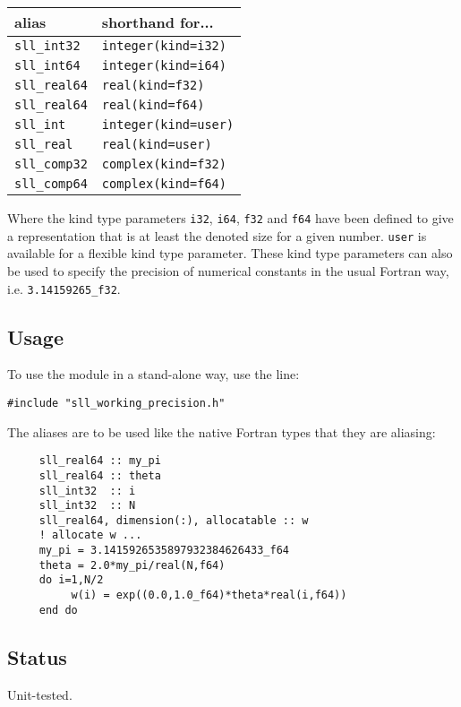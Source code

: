 \documentclass[]{report}   %
\begin{document}
\vspace{+0.5cm}
\begin{tabular}{l l}
alias & shorthand for... \\
\hline
\verb+sll_int32+ & \verb+integer(kind=i32)+ \\
\verb+sll_int64+ & \verb+integer(kind=i64)+ \\
\verb+sll_real64+ & \verb+real(kind=f32)+ \\
\verb+sll_real64+ & \verb+real(kind=f64)+ \\
\verb+sll_int+  & \verb+integer(kind=user)+ \\
\verb+sll_real+ & \verb+real(kind=user)+ \\
\verb+sll_comp32+ & \verb+complex(kind=f32)+\\
\verb+sll_comp64+ & \verb+complex(kind=f64)+\\
\hline
\end{tabular}
\vspace{+0.5cm}


Where the kind type parameters \verb+i32+, \verb+i64+, \verb+f32+ and \verb+f64+ have been defined to give a representation that is at least the denoted size for a given number. \verb+user+ is available for a flexible kind type parameter. These kind type parameters can also be used to specify the precision of numerical constants in the usual Fortran way, i.e. \verb+3.14159265_f32+.

\subsection{Usage}
To use the module in a stand-alone way, use the line:
\begin{verbatim}
#include "sll_working_precision.h"
\end{verbatim}

The aliases are to be used like the native Fortran types that they are aliasing:

\begin{verbatim}
     sll_real64 :: my_pi
     sll_real64 :: theta
     sll_int32  :: i
     sll_int32  :: N
     sll_real64, dimension(:), allocatable :: w
     ! allocate w ...
     my_pi = 3.1415926535897932384626433_f64
     theta = 2.0*my_pi/real(N,f64)
     do i=1,N/2
          w(i) = exp((0.0,1.0_f64)*theta*real(i,f64))
     end do
\end{verbatim}

\subsection{Status}
Unit-tested.
\end{document}
